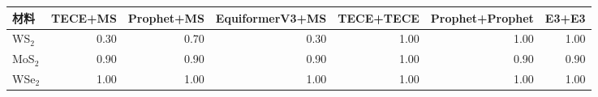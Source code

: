\begin{tabular}{lrrrrrr}
\toprule
材料 & TECE+MS & Prophet+MS & EquiformerV3+MS & TECE+TECE & Prophet+Prophet & E3+E3 \\
\midrule
WS$_2$ & 0.30 & 0.70 & 0.30 & 1.00 & 1.00 & 1.00 \\
MoS$_2$ & 0.90 & 0.90 & 0.90 & 1.00 & 0.90 & 0.90 \\
WSe$_2$ & 1.00 & 1.00 & 1.00 & 1.00 & 1.00 & 1.00 \\
\bottomrule
\end{tabular}
